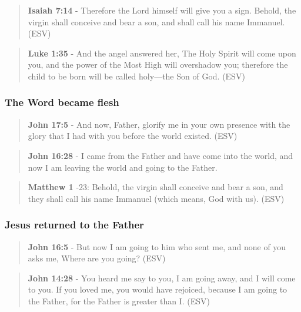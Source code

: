 \documentclass[11pt]{article}
\begin{document}
\begin{quote}
\textbf{Isaiah 7:14} - Therefore the Lord himself will give you a sign. Behold, the virgin shall conceive and bear a son, and shall call his name Immanuel. (ESV)
\end{quote}

\begin{quote}
\textbf{Luke 1:35} - And the angel answered her, The Holy Spirit will come upon you, and the power of the Most High will overshadow you; therefore the child to be born will be called holy—the Son of God. (ESV)
\end{quote}

\subsubsection{The Word became flesh}
\label{sec:org16160d4}

\begin{quote}
\textbf{John 17:5} - And now, Father, glorify me in your own presence with the glory that I had with you before the world existed. (ESV)
\end{quote}

\begin{quote}
\textbf{John 16:28} - I came from the Father and have come into the world, and now I am leaving the world and going to the Father.
\end{quote}

\begin{quote}
\textbf{Matthew 1} -23: Behold, the virgin shall conceive and bear a son, and they shall call his name Immanuel (which means, God with us). (ESV)
\end{quote}

\subsubsection{Jesus returned to the Father}
\label{sec:org88ec13c}

\begin{quote}
\textbf{John 16:5} - But now I am going to him who sent me, and none of you asks me, Where are you going? (ESV)
\end{quote}

\begin{quote}
\textbf{John 14:28} - You heard me say to you, I am going away, and I will come to you. If you loved me, you would have rejoiced, because I am going to the Father, for the Father is greater than I. (ESV)
\end{quote}
\end{document}
